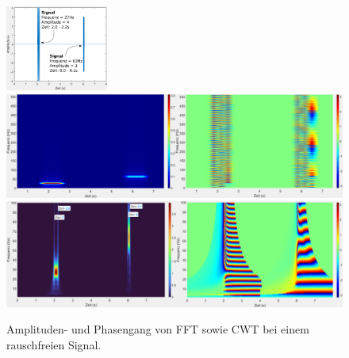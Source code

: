 \begin{figure}
	\centering
	\includegraphics[width=0.3\textwidth]{papers/wavelets/images/18-1_CWTvsFFTSignal.png}
	\includegraphics[width=\textwidth]{papers/wavelets/images/18-2_FFTnoiseFree.png}
	\includegraphics[width=\textwidth]{papers/wavelets/images/18-3_CWTnoiseFree.png}
	\caption{Amplituden- und Phasengang von FFT sowie CWT bei einem rauschfreien Signal.}
	\label{wavelet:fig:FFTnoiseFree}
\end{figure}

	
